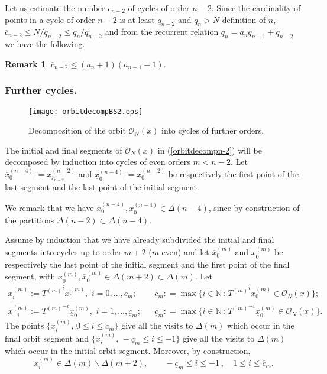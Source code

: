 \documentclass{conm-p-l}
\numberwithin{equation}{section}
\newtheorem{rem}[theorem]{Remark}
\begin{document}
Let us estimate the number $\overline{c}_{n-2}$ of cycles of order $n-2$. 
Since the cardinality of points in a cycle of order $n-2$ is at least $q_{n-2}$ and $q_n>N$ definition of $n$, $\overline{c}_{n-2} \leq N/q_{n-2}\leq  q_n/q_{n-2}$ and  from the recurrent relation $q_n = a_{n} q_{n-1} + q_{n-2}$ we have the following.
\begin{rem}\label{cyclesnbound}
$\overline{c}_{n-2} \leq ( a_n +1 )(  a_{n-1} +1 )$.
\end{rem}

\subsubsection{Further cycles.}
\begin{figure}
\centering
\texttt{[image: orbitdecompBS2.eps]}
\caption{Decomposition of the orbit ${\mathcal{O}_{{N}}({x})}$ into cycles of further orders.}
\end{figure}
The initial and final segments of ${\mathcal{O}_{{N}}({x})}$ in (\ref{orbitdecompn-2})
 will be decomposed by induction into cycles of even orders $m<n-2$.
Let   $ \overline{x}^{(n-4)}_{0}:=x^{(n-2)}_{\overline{c}_{n-2}} $ and  $\underline{x}^{(n-4)}_{0}:=x^{(n-2)}_{0} $ be respectively the first point of the last segment and the last point of the initial segment.
 
We remark that  we have  $\overline{x}^{(n-4)}_{0}, \underline{x}^{(n-4)}_{0} \in \Delta(n\!-\!4)$, since by construction of the partitions   $\Delta(n\!-\!2)\subset  \Delta(n\!-\!4)$.

Assume by induction that we have already subdivided the initial and final segments into cycles up to order $m+2$ ($m$ even) and let
$\overline{x}^{(m)}_{0}$ and  $\underline{x}^{(m)}_{0}$ be respectively the last point of the initial segment and the first point of the final segment, with $\underline{x}^{(m)}_{0}, \overline{x}^{(m)}_{0} \in  \Delta(m\!+\!2)\subset  \Delta(m)$. 
 Let
\begin{eqnarray}
{x}^{(m)}_i :={T^{(m)}}^i   \overline{x}^{(m)}_{0},\, \,  i=0,\dots,  \overline{c}_{m};  &&   \overline{c}_{m} : = \max \{ i \in \mathbb{N} {\, : \, } {T^{(m)}}^i  \overline{x}^{(m)}_0 \in {\mathcal{O}_{{N}}({x})}\}; \nonumber \\
{x}^{(m)}_{-i} :={T^{(m)}}^{-i}   \underline{x}^{(m)}_{0}, \, \,   i=1,\dots,  \underline{c}_{m};  &&   \underline{c}_{m} : = \max \{ i \in \mathbb{N} {\, : \, } {T^{(m)}}^{-i}  \underline{x}^{(m)}_0 \in {\mathcal{O}_{{N}}({x})}\}. \nonumber
\end{eqnarray}
The points  $ \{{x}^{(m)}_i, \, 0\leq i\leq {\overline{c}}_{m}\}$ give all the visits to $\Delta(m)$ which occur in the final orbit segment and  $\{ {x}^{(m)}_i, \, - \underline{c}_{m} \leq i \leq -1\}$ 
 give all the visits to $\Delta(m)$ which occur in the initial orbit segment. Moreover, by construction, 
\begin{equation}\label{inclusionsvisits}
{x}^{(m)}_i \in \Delta(m)\backslash \Delta(m+2), \qquad   - \underline{c}_{m} \leq i \leq -1\ , \quad    1 \leq  i\leq {\overline{c}}_{m}.
\end{equation}
\end{document}
